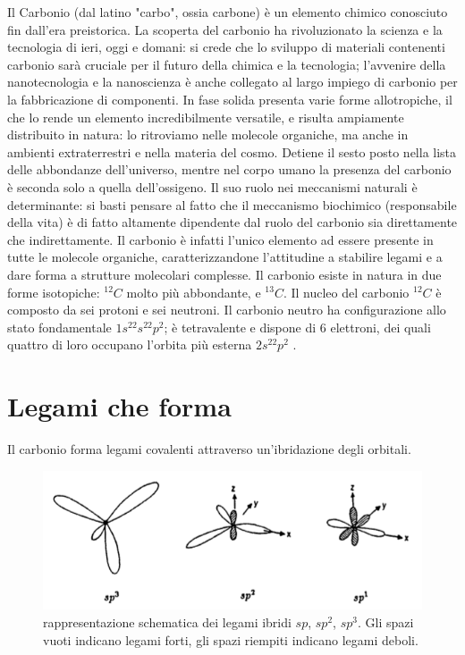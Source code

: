 \documentclass[a4paper,titlepage]{book}
\begin{document}
Il Carbonio (dal latino "carbo", ossia carbone) è un elemento chimico conosciuto fin dall'era preistorica. La scoperta del carbonio ha rivoluzionato la scienza e la tecnologia di ieri, oggi e domani: si crede che lo sviluppo di materiali contenenti carbonio sarà cruciale per il futuro della chimica e la tecnologia; l'avvenire della nanotecnologia e la nanoscienza è anche collegato al largo impiego di carbonio per la fabbricazione di componenti. In fase solida presenta varie forme allotropiche, il che lo rende un elemento incredibilmente versatile, e risulta ampiamente distribuito in natura: lo ritroviamo nelle molecole organiche, ma anche in ambienti extraterrestri e nella materia del cosmo. Detiene il sesto posto nella lista delle abbondanze dell'universo, mentre nel corpo umano la presenza del carbonio è seconda solo a quella dell'ossigeno. Il suo ruolo nei meccanismi naturali è determinante: si basti pensare al fatto che il meccanismo biochimico (responsabile della vita) è di fatto altamente dipendente dal ruolo del carbonio sia direttamente che indirettamente. Il carbonio è infatti l'unico elemento ad essere presente in tutte le molecole organiche, caratterizzandone l'attitudine a stabilire legami e a dare forma a strutture molecolari complesse.
Il carbonio esiste in natura in due forme isotopiche: $^{12} C$ molto più abbondante, e $^{13} C$. Il nucleo del carbonio $^{12}C$ è composto da sei protoni e sei neutroni. Il carbonio neutro ha configurazione allo stato fondamentale  $1s^22s^22p^2$; è tetravalente e dispone di 6 elettroni, dei quali quattro di loro occupano l'orbita più esterna $2s^22p^2$ .

\section{Legami che forma} \label{legami}
Il carbonio forma legami covalenti attraverso un'ibridazione degli orbitali.
\begin{figure}[h] 
	\centering \includegraphics[width=1\columnwidth]{bondings.png}
	\caption{
		\label{fig:bond}  rappresentazione schematica dei legami ibridi $sp$, $sp^2$, $sp^3$. Gli spazi vuoti indicano legami forti, gli spazi riempiti indicano legami deboli.
	}
	\label{fig:bonds}
\end{figure}
\end{document}

